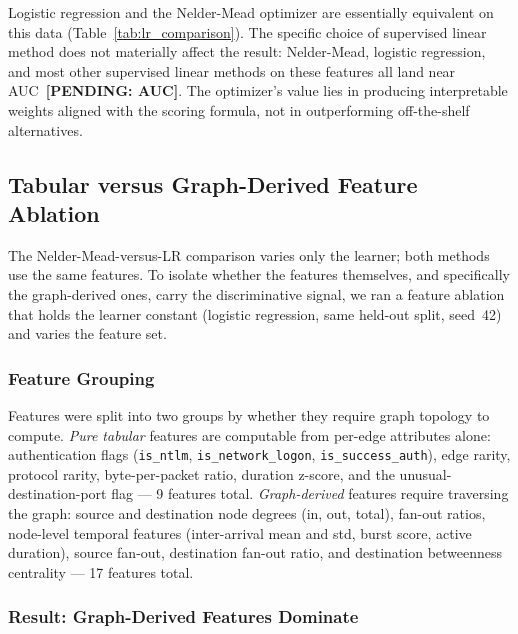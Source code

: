 Logistic regression and the Nelder-Mead optimizer are essentially equivalent on this data (Table~\ref{tab:lr_comparison}). The specific choice of supervised linear method does not materially affect the result: Nelder-Mead, logistic regression, and most other supervised linear methods on these features all land near AUC~\textbf{[PENDING: AUC]}. The optimizer's value lies in producing interpretable weights aligned with the scoring formula, not in outperforming off-the-shelf alternatives.


\subsection{Tabular versus Graph-Derived Feature Ablation}
\label{sec:tabular_graph_ablation}

The Nelder-Mead-versus-LR comparison varies only the learner; both methods use the same features. To isolate whether the features themselves, and specifically the graph-derived ones, carry the discriminative signal, we ran a feature ablation that holds the learner constant (logistic regression, same held-out split, seed~42) and varies the feature set.

\subsubsection{Feature Grouping}

Features were split into two groups by whether they require graph topology to compute. \emph{Pure tabular} features are computable from per-edge attributes alone: authentication flags (\texttt{is\_ntlm}, \texttt{is\_network\_logon}, \texttt{is\_success\_auth}), edge rarity, protocol rarity, byte-per-packet ratio, duration z-score, and the unusual-destination-port flag --- 9 features total. \emph{Graph-derived} features require traversing the graph: source and destination node degrees (in, out, total), fan-out ratios, node-level temporal features (inter-arrival mean and std, burst score, active duration), source fan-out, destination fan-out ratio, and destination betweenness centrality --- 17 features total.

\subsubsection{Result: Graph-Derived Features Dominate}

